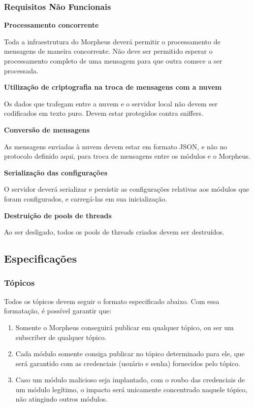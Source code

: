 \subsubsection{Requisitos Não Funcionais}
\begin{description}
\item \textbf{Processamento concorrente}

Toda a infraestrutura do Morpheus deverá permitir o processamento de mensagens de maneira concorrente. Não deve ser permitido esperar o processamento completo de uma mensagem para que outra comece a ser processada.

\item \textbf{Utilização de criptografia na troca de mensagens com a nuvem}

Os dados que trafegam entre a nuvem e o servidor local não devem ser codificados em texto puro. Devem estar protegidos contra sniffers.

\item \textbf{Conversão de mensagens}

As mensagens enviadas à nuvem devem estar em formato JSON, e não no protocolo definido aqui, para troca de mensagens entre os módulos e o Morpheus.

\item \textbf{Serialização das configurações}

O servidor deverá serializar e persistir as configurações relativas aos módulos que foram configurados, e carregá-las em sua inicialização.

\item \textbf{Destruição de pools de threads}

Ao ser desligado, todos os pools de threads criados devem ser destruídos.

\end{description}

\subsection{Especificações}

\subsubsection{Tópicos}
Todos os tópicos devem seguir o formato especificado abaixo. Com essa formatação, é possível garantir que:

\begin{enumerate}
\item Somente o Morpheus conseguirá publicar em qualquer tópico, ou ser um subscriber de qualquer tópico.
\item Cada módulo somente consiga publicar no tópico determinado para ele, que será garantido com as credenciais (usuário e senha) fornecidos pelo tópico.
\item Caso um módulo malicioso seja implantado, com o roubo das credenciais de um módulo legítimo, o impacto será unicamente concentrado naquele tópico, não atingindo outros módulos.
\end{enumerate}

